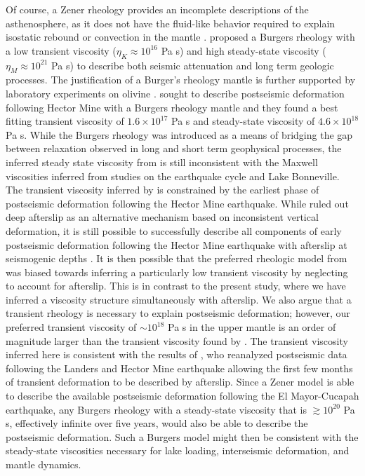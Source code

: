 \documentclass[draft,linenumbers]{AGUJournal}
\begin{document}
Of course, a Zener rheology provides an incomplete descriptions of the asthenosphere, as it does not have the fluid-like behavior required to explain isostatic rebound or convection in the mantle \citep{OConnell1971}.  \citet{Yuen1982} proposed a Burgers rheology with a low transient viscosity ($\eta_K\approx10^{16}$ Pa s) and high steady-state viscosity ($\eta_M\approx10^{21}$ Pa s) to describe both seismic attenuation and long term geologic processes.  The justification of a Burger's rheology mantle is further supported by laboratory experiments on olivine \citep{Chopra1997}.  \citet{Pollitz2003} sought to describe postseismic deformation following Hector Mine with a Burgers rheology mantle and they found a best fitting transient viscosity of $1.6\times10^{17}$ Pa s and steady-state viscosity of $4.6\times10^{18}$ Pa s. While the Burgers rheology was introduced as a means of bridging the gap between relaxation observed in long and short term geophysical processes, the inferred steady state viscosity from \citet{Pollitz2003} is still inconsistent with the Maxwell viscosities inferred from studies on the earthquake cycle and Lake Bonneville.  The transient viscosity inferred by \citet{Pollitz2003} is constrained by the earliest phase of postseismic deformation following the Hector Mine earthquake. While \citet{Pollitz2003} ruled out deep afterslip as an alternative mechanism based on inconsistent vertical deformation, it is still possible to successfully describe all components of early postseismic deformation following the Hector Mine earthquake with afterslip at seismogenic depths \citep{Jacobs2002}. It is then possible that the preferred rheologic model from \citet{Pollitz2003} was biased towards inferring a particularly low transient viscosity by neglecting to account for afterslip.  This is in contrast to the present study, where we have inferred a viscosity structure simultaneously with afterslip.  We also argue that a transient rheology is necessary to explain postseismic deformation; however, our preferred transient viscosity of ${\sim}10^{18}$ Pa s in the upper mantle is an order of magnitude larger than the transient viscosity found by \citet{Pollitz2003}.  The transient viscosity inferred here is consistent with the results of \citet{Pollitz2015}, who reanalyzed postseismic data following the Landers and Hector Mine earthquake allowing the first few months of transient deformation to be described by afterslip.  Since a Zener model is able to describe the available postseismic deformation following the El Mayor-Cucapah earthquake, any Burgers rheology with a steady-state viscosity that is $\gtrsim10^{20}$ Pa s, effectively infinite over five years, would also be able to describe the postseismic deformation. Such a Burgers model might then be consistent with the steady-state viscosities necessary for lake loading, interseismic deformation, and mantle dynamics.
\end{document}
